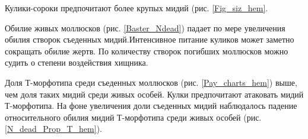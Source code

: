 \documentclass[20pt,a0,portrait]{a0poster}
\begin{document}
\begin{minipage}[t]{0.46\linewidth}
\begin{minipage}[t]{0.46\linewidth}
\begin{center}
			\label{N_dead_Prop_T_hem}
		\end{center}
\end{minipage}\vspace{0.5cm}



Кулики-сороки предпочитают более крупых мидий (рис. \ref{Fig_siz_hem}.

Обилие живых моллюсков (рис. \ref{Baster_Ndead}) падает по мере увеличения обилия створок съеденных мидий.Интенсивное питание куликов может заметно сокращать обилие жертв. По количеству створок погибших моллюсков можно судить о степени воздействия хищника.

Доля Т-морфотипа среди съеденных моллюсков (рис.  \ref{Pay_charts_hem}) выше, чем доля таких мидий среди живых особей. Кулки предпочитают атаковать мидий Т-морфотипа. 
На фоне увеличения доли съеденных мидий наблюдалось падение относительного обилия мидий Т-морфотипа среди живых особей (рис. \ref{N_dead_Prop_T_hem}).

\end{minipage}





%
%
%
%
%

		
\end{document}
